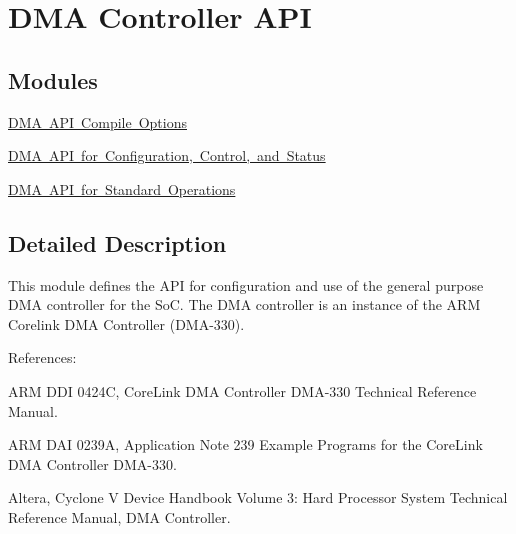 \hypertarget{group__ALT__DMA}{}\section{D\+MA Controller A\+PI}
\label{group__ALT__DMA}
\subsection*{Modules}
\begin{DoxyCompactItemize}
\item 
\mbox{\hyperlink{group__ALT__DMA__COMPILE}{D\+M\+A A\+P\+I Compile Options}}
\item 
\mbox{\hyperlink{group__ALT__DMA__CSR}{D\+M\+A A\+P\+I for Configuration, Control, and Status}}
\item 
\mbox{\hyperlink{group__ALT__DMA__STD__OPS}{D\+M\+A A\+P\+I for Standard Operations}}
\end{DoxyCompactItemize}


\subsection{Detailed Description}
This module defines the A\+PI for configuration and use of the general purpose D\+MA controller for the SoC. The D\+MA controller is an instance of the A\+RM Corelink D\+MA Controller (D\+M\+A-\/330).

References\+:
\begin{DoxyItemize}
\item A\+RM D\+DI 0424C, Core\+Link D\+MA Controller D\+M\+A-\/330 Technical Reference Manual.
\item A\+RM D\+AI 0239A, Application Note 239 Example Programs for the Core\+Link D\+MA Controller D\+M\+A-\/330.
\item Altera, Cyclone V Device Handbook Volume 3\+: Hard Processor System Technical Reference Manual, D\+MA Controller. 
\end{DoxyItemize}